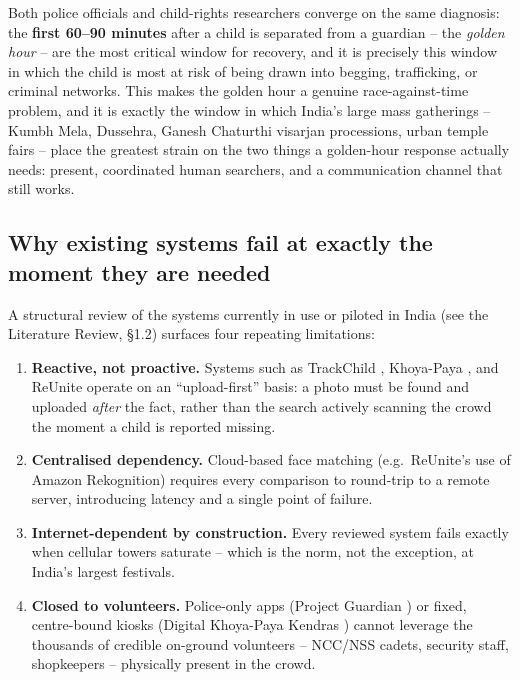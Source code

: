 \documentclass[12pt,a4paper,oneside]{report}
\begin{document}
Both police officials and child-rights researchers converge on the same
diagnosis: the \textbf{first 60--90 minutes} after a child is separated from a
guardian -- the \emph{golden hour} -- are the most critical window for
recovery, and it is precisely this window in which the child is most at risk
of being drawn into begging, trafficking, or criminal networks. This makes
the golden hour a genuine race-against-time problem, and it is exactly the
window in which India's large mass gatherings -- Kumbh Mela, Dussehra,
Ganesh Chaturthi visarjan processions, urban temple fairs -- place the
greatest strain on the two things a golden-hour response actually needs:
present, coordinated human searchers, and a communication channel that still
works.

\subsection*{Why existing systems fail at exactly the moment they are needed}

A structural review of the systems currently in use or piloted in India (see
the Literature Review, \S1.2) surfaces four repeating limitations:

\begin{enumerate}[label=(\roman*)]
  \item \textbf{Reactive, not proactive.} Systems such as TrackChild
        \cite{trackchild}, Khoya-Paya \cite{khoyapaya}, and ReUnite
        \cite{reunite} operate on an ``upload-first'' basis: a photo
        must be found and uploaded \emph{after} the fact, rather than the
        search actively scanning the crowd the moment a child is reported
        missing.
  \item \textbf{Centralised dependency.} Cloud-based face matching (e.g.\
        ReUnite's \cite{reunite} use of Amazon Rekognition) requires every
        comparison to round-trip to a remote server, introducing latency
        and a single point of failure.
  \item \textbf{Internet-dependent by construction.} Every reviewed system
        fails exactly when cellular towers saturate -- which is the norm,
        not the exception, at India's largest festivals.
  \item \textbf{Closed to volunteers.} Police-only apps (Project Guardian
        \cite{guardian}) or fixed, centre-bound kiosks (Digital Khoya-Paya
        Kendras \cite{digitalkendra}) cannot
        leverage the thousands of credible on-ground volunteers -- NCC/NSS
        cadets, security staff, shopkeepers -- physically present in the
        crowd.
\end{enumerate}
\end{document}
